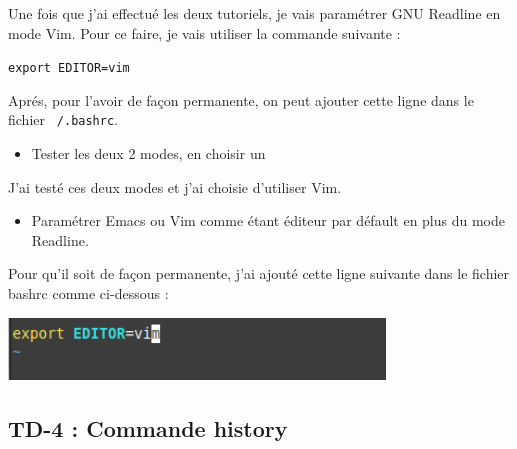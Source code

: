 \documentclass[12pt]{article}
\begin{document}
\vspace{0.3cm}

Une fois que j'ai effectué les deux tutoriels, je vais paramétrer GNU Readline en mode Vim. Pour ce faire, je vais utiliser la commande suivante :

\vspace{0.3cm}

\texttt{export EDITOR=vim}

\vspace{0.3cm}

Aprés, pour l'avoir de façon permanente, on peut ajouter cette ligne dans le fichier \texttt{~/.bashrc}.

\vspace{0.3cm}

\begin{itemize}
  \item Tester les deux 2 modes, en choisir un
\end{itemize}

\vspace{0.3cm}

J'ai testé ces deux modes et j'ai choisie d'utiliser Vim. 

\vspace{0.3cm}

\begin{itemize}
  \item Paramétrer Emacs ou Vim comme étant éditeur par défault en plus du mode Readline.
\end{itemize}

\vspace{0.3cm}

Pour qu'il soit de façon permanente, j'ai ajouté cette ligne suivante dans le fichier bashrc comme ci-dessous :

\vspace{0.3cm}

\begin{center}
  \includegraphics[width=10cm]{Image-TD-3/Ajout-ligne-bashrc.png}
\end{center}

\newpage

  \subsection{TD-4 : Commande history}
\end{document}
